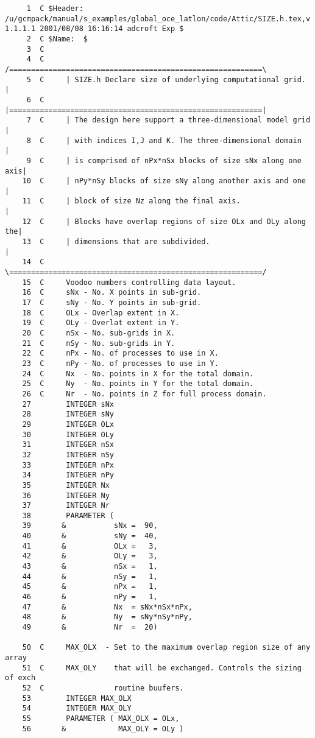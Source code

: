 
\begin{verbatim}
     1	C $Header: /u/gcmpack/manual/s_examples/global_oce_latlon/code/Attic/SIZE.h.tex,v 1.1.1.1 2001/08/08 16:16:14 adcroft Exp $
     2	C $Name:  $
     3	C
     4	C     /==========================================================\
     5	C     | SIZE.h Declare size of underlying computational grid.    |
     6	C     |==========================================================|
     7	C     | The design here support a three-dimensional model grid   |
     8	C     | with indices I,J and K. The three-dimensional domain     |
     9	C     | is comprised of nPx*nSx blocks of size sNx along one axis|
    10	C     | nPy*nSy blocks of size sNy along another axis and one    |
    11	C     | block of size Nz along the final axis.                   |
    12	C     | Blocks have overlap regions of size OLx and OLy along the|
    13	C     | dimensions that are subdivided.                          |
    14	C     \==========================================================/
    15	C     Voodoo numbers controlling data layout.
    16	C     sNx - No. X points in sub-grid.
    17	C     sNy - No. Y points in sub-grid.
    18	C     OLx - Overlap extent in X.
    19	C     OLy - Overlat extent in Y.
    20	C     nSx - No. sub-grids in X.
    21	C     nSy - No. sub-grids in Y.
    22	C     nPx - No. of processes to use in X.
    23	C     nPy - No. of processes to use in Y.
    24	C     Nx  - No. points in X for the total domain.
    25	C     Ny  - No. points in Y for the total domain.
    26	C     Nr  - No. points in Z for full process domain.
    27	      INTEGER sNx
    28	      INTEGER sNy
    29	      INTEGER OLx
    30	      INTEGER OLy
    31	      INTEGER nSx
    32	      INTEGER nSy
    33	      INTEGER nPx
    34	      INTEGER nPy
    35	      INTEGER Nx
    36	      INTEGER Ny
    37	      INTEGER Nr
    38	      PARAMETER (
    39	     &           sNx =  90,
    40	     &           sNy =  40,
    41	     &           OLx =   3,
    42	     &           OLy =   3,
    43	     &           nSx =   1,
    44	     &           nSy =   1,
    45	     &           nPx =   1,
    46	     &           nPy =   1,
    47	     &           Nx  = sNx*nSx*nPx,
    48	     &           Ny  = sNy*nSy*nPy,
    49	     &           Nr  =  20)
       
    50	C     MAX_OLX  - Set to the maximum overlap region size of any array
    51	C     MAX_OLY    that will be exchanged. Controls the sizing of exch
    52	C                routine buufers.
    53	      INTEGER MAX_OLX
    54	      INTEGER MAX_OLY
    55	      PARAMETER ( MAX_OLX = OLx,
    56	     &            MAX_OLY = OLy )
\end{verbatim}
